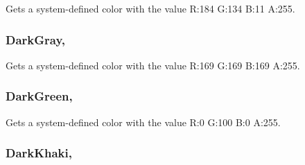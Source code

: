 Gets a system-\/defined color with the value R\+:184 G\+:134 B\+:11 A\+:255.

\hypertarget{structMicrosoft_1_1Xna_1_1Framework_1_1Color_a0fa98db8de4f25fad389e3229e766b33}{}
\subsubsection[{Dark\+Gray}]{ Dark\+Gray\hspace{0.3cm}{\ttfamily [static]}, {\ttfamily [get]}}\label{structMicrosoft_1_1Xna_1_1Framework_1_1Color_a0fa98db8de4f25fad389e3229e766b33}


Gets a system-\/defined color with the value R\+:169 G\+:169 B\+:169 A\+:255.

\hypertarget{structMicrosoft_1_1Xna_1_1Framework_1_1Color_af9cecdf4f2189411cbebdd93554db248}{}
\subsubsection[{Dark\+Green}]{ Dark\+Green\hspace{0.3cm}{\ttfamily [static]}, {\ttfamily [get]}}\label{structMicrosoft_1_1Xna_1_1Framework_1_1Color_af9cecdf4f2189411cbebdd93554db248}


Gets a system-\/defined color with the value R\+:0 G\+:100 B\+:0 A\+:255.

\hypertarget{structMicrosoft_1_1Xna_1_1Framework_1_1Color_a15e4b1698c04e3782733418c6b93d00d}{}
\subsubsection[{Dark\+Khaki}]{ Dark\+Khaki\hspace{0.3cm}{\ttfamily [static]}, {\ttfamily [get]}}\label{structMicrosoft_1_1Xna_1_1Framework_1_1Color_a15e4b1698c04e3782733418c6b93d00d}


